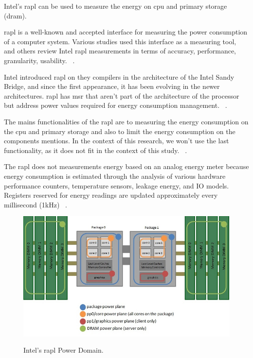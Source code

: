     Intel’s \gls{rapl} can be used to measure the energy on \gls{cpu} and primary storage (\gls{dram}).
	
	
	\gls{rapl} is a well-known and accepted interface for measuring the power consumption of a computer system. Various studies used this interface as a measuring tool, and others review Intel \gls{rapl} measurements in terms of accuracy, performance, granularity, usability. ~\cite{raplpref,raplpref2}.
	

	Intel introduced \gls{rapl} on they compilers in the architecture of the Intel Sandy Bridge, and since the first appearance, it has been evolving in the newer architectures. \gls{rapl} has \gls{msr} that aren't part of the architecture of the processor but address power values required for energy consumption management. ~\cite{raplpref,intel64and,portela2016}.
	
	
    The mains functionalities of the \gls{rapl} are to measuring the energy consumption on the \gls{cpu} and primary storage and also to limit the energy consumption on the components mentions. In the context of this research, we won't use the last functionality, as it does not fit in the context of this study. ~\cite{raplpref,raplpref2,intel64and}.
	
	
	The \gls{rapl} does not measurements energy based on an analog energy meter because energy consumption is estimated through the analysis of various hardware performance counters, temperature sensors, leakage energy, and IO models.  Registers reserved for energy readings are updated approximately every millisecond (1kHz) ~\cite{energypapi,portela2016}.

    \begin{figure}[h!]
    \caption{Intel’s \gls{rapl} Power Domain.}
    \centering
    \includegraphics[width=\linewidth]{Chapters/images/power_domains2.jpg}   \label{fig:powerdomain}
    \end{figure}
    
